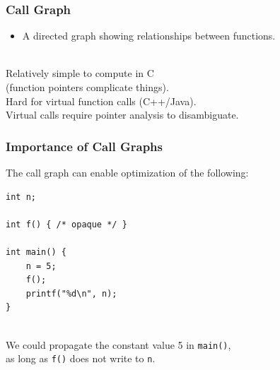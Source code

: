 \documentclass[aspectratio=43]{beamer}
\newenvironment{changemargin}[1]{%
  \begin{list}{}{%
    \setlength{\topsep}{0pt}%
    \setlength{\leftmargin}{#1}%
    \setlength{\rightmargin}{1em}
    \setlength{\listparindent}{\parindent}%
    \setlength{\itemindent}{\parindent}%
    \setlength{\parsep}{\parskip}%
  }%
  \item[]}{\end{list}}
\begin{document}
\begin{frame}
  \frametitle{Call Graph}
  
  \begin{changemargin}{1.5cm}
\begin{itemize}
\item     A directed graph showing relationships between functions.
\end{itemize}
~\\
     Relatively simple to compute in C\\\qquad (function pointers complicate things).\\

     Hard for virtual function calls (C++/Java).\\[1em]

     Virtual calls require pointer analysis to disambiguate.
  \end{changemargin}
\end{frame}

\begin{frame}[fragile]
  \frametitle{Importance of Call Graphs}

  \begin{changemargin}{2cm}

  The call graph can enable optimization of the following:

  \begin{lstlisting}
int n;

int f() { /* opaque */ }

int main() {
    n = 5;
    f();
    printf("%d\n", n);
}
  \end{lstlisting}
~\\
  We could propagate the constant value 5 in {\tt main()},\\ \qquad as long as {\tt f()}
  does not write to {\tt n}.
  \end{changemargin}
\end{frame}
\end{document}
